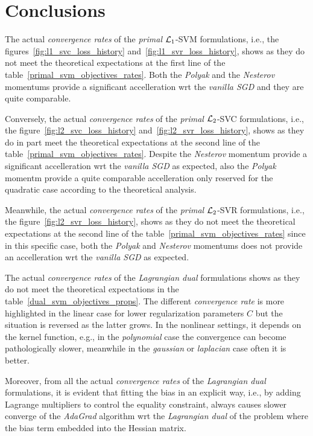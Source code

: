 \section{Conclusions}

The actual \emph{convergence rates} of the \emph{primal} $\protect \mathcal{L}_1$-SVM formulations, i.e., the figures~\ref{fig:l1_svc_loss_history} and~\ref{fig:l1_svr_loss_history}, shows as they do not meet the theoretical expectations at the first line of the table~\ref{primal_svm_objectives_rates}. Both the \emph{Polyak} and the \emph{Nesterov} momentums provide a significant accelleration wrt the \emph{vanilla SGD} and they are quite comparable.

Conversely, the actual \emph{convergence rates} of the \emph{primal} $\protect \mathcal{L}_2$-SVC formulations, i.e., the figure~\ref{fig:l2_svc_loss_history} and~\ref{fig:l2_svr_loss_history}, shows as they do in part meet the theoretical expectations at the second line of the table~\ref{primal_svm_objectives_rates}. Despite the \emph{Nesterov} momentum provide a significant accelleration wrt the \emph{vanilla SGD} as expected, also the \emph{Polyak} momentm provide a quite comparable accelleration only reserved for the quadratic case according to the theoretical analysis.

Meanwhile, the actual \emph{convergence rates} of the \emph{primal} $\protect \mathcal{L}_2$-SVR formulations, i.e., the figure~\ref{fig:l2_svr_loss_history}, shows as they do not meet the theoretical expectations at the second line of the table~\ref{primal_svm_objectives_rates} since in this specific case, both the \emph{Polyak} and \emph{Nesterov} momentums does not provide an accelleration wrt the \emph{vanilla SGD} as expected.

\bigskip

The actual \emph{convergence rates} of the \emph{Lagrangian dual} formulations shows as they do not meet the theoretical expectations in the table~\ref{dual_svm_objectives_props}. The different \emph{convergence rate} is more highlighted in the linear case for lower regularization parameters $C$ but the situation is reversed as the latter grows. In the nonlinear settings, it depends on the kernel function, e.g., in the \emph{polynomial} case the convergence can become pathologically slower, meanwhile in the \emph{gaussian} or \emph{laplacian} case often it is better.

Moreover, from all the actual \emph{convergence rates} of the \emph{Lagrangian dual} formulations, it is evident that fitting the bias in an explicit way, i.e., by adding Lagrange multipliers to control the equality constraint, always causes slower converge of the \emph{AdaGrad} algorithm wrt the \emph{Lagrangian dual} of the problem where the bias term embedded into the Hessian matrix.

